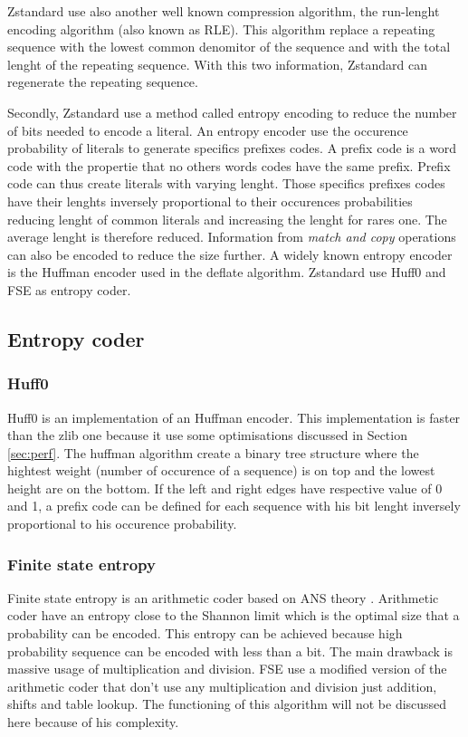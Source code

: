 \documentclass{sig-alternate-05-2015}
\begin{document}
    Zstandard use also another well known compression algorithm, the run-lenght encoding algorithm
    (also known as RLE). This algorithm replace a repeating sequence with the lowest common
    denomitor of the sequence and with the total lenght of the repeating sequence. With this two
    information, Zstandard can regenerate the repeating sequence.

    Secondly, Zstandard use a method called entropy encoding to reduce the number of bits needed to
    encode a literal. An entropy encoder use the occurence probability of literals to generate
    specifics prefixes codes. A prefix code is a word code with the propertie that no others words
    codes have the same prefix. Prefix code can thus create literals with varying lenght. Those
    specifics prefixes codes have their lenghts inversely proportional to their occurences
    probabilities reducing lenght of common literals and increasing the lenght for rares one. The
    average lenght is therefore reduced. Information from \textit{match and copy} operations can
    also be encoded to reduce the size further. A widely known entropy encoder is the Huffman
    encoder used in the deflate algorithm. Zstandard use Huff0 and FSE as entropy coder.

    \subsection{Entropy coder}
    \subsubsection{Huff0}
        Huff0 is an implementation of an Huffman encoder. This implementation is faster than the
        zlib one because it use some optimisations discussed in Section \ref{sec:perf}. The huffman
        algorithm create a binary tree structure where the hightest weight (number of occurence of a
        sequence) is on top and the lowest height are on the bottom. If the left and right edges have
        respective value of 0 and 1, a prefix code can be defined for each sequence with his bit
        lenght inversely proportional to his occurence probability.

    \subsubsection{Finite state entropy}
        Finite state entropy \cite{fse} is an arithmetic coder based on ANS theory \cite{ANS2013}.
        Arithmetic coder have an entropy close to the Shannon limit which is the optimal size that a
        probability can be encoded. This entropy can be achieved because high probability sequence
        can be encoded with less than a bit. The main drawback is massive usage of multiplication
        and division. FSE use a modified version of the arithmetic coder that don't use any
        multiplication and division just addition, shifts and table lookup. The functioning of this
        algorithm will not be discussed here because of his complexity.
\end{document}
